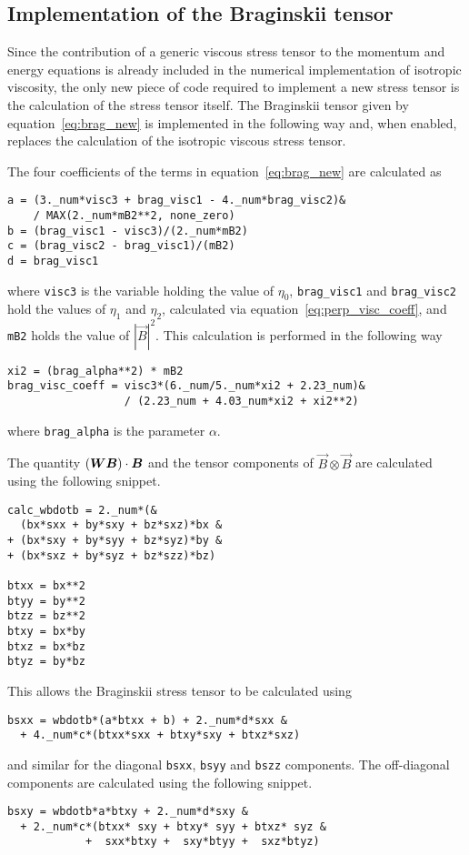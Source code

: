 \subsection{Implementation of the Braginskii tensor}

Since the contribution of a generic viscous stress tensor to the momentum and energy equations is already included in the numerical implementation of isotropic viscosity, the only new piece of code required to implement a new stress tensor is the calculation of the stress tensor itself. The Braginskii tensor given by equation~\eqref{eq:brag_new} is implemented in the following way and, when enabled, replaces the calculation of the isotropic viscous stress tensor. 

The four coefficients of the terms in equation~\eqref{eq:brag_new} are calculated as
\begin{verbatim}
a = (3._num*visc3 + brag_visc1 - 4._num*brag_visc2)&
    / MAX(2._num*mB2**2, none_zero)
b = (brag_visc1 - visc3)/(2._num*mB2)
c = (brag_visc2 - brag_visc1)/(mB2)
d = brag_visc1
\end{verbatim}
where \verb|visc3| is the variable holding the value of $\eta_0$, \verb|brag_visc1| and \verb|brag_visc2| hold the values of $\eta_1$ and $\eta_2$, calculated via equation~\eqref{eq:perp_visc_coeff}, and \verb|mB2| holds the value of $|\vec{B}|^2$. This calculation is performed in the following way
\begin{verbatim}
xi2 = (brag_alpha**2) * mB2
brag_visc_coeff = visc3*(6._num/5._num*xi2 + 2.23_num)&
                  / (2.23_num + 4.03_num*xi2 + xi2**2)
\end{verbatim}
where \verb|brag_alpha| is the parameter $\alpha$.

The quantity $({\bm W} {\bm B}) \cdot {\bm B}$ and the tensor components of $\vec{B} \otimes \vec{B}$ are calculated using the following snippet.
\begin{verbatim}
calc_wbdotb = 2._num*(&
  (bx*sxx + by*sxy + bz*sxz)*bx &
+ (bx*sxy + by*syy + bz*syz)*by &
+ (bx*sxz + by*syz + bz*szz)*bz)

btxx = bx**2
btyy = by**2
btzz = bz**2
btxy = bx*by
btxz = bx*bz
btyz = by*bz
\end{verbatim}

This allows the Braginskii stress tensor to be calculated using
\begin{verbatim}
bsxx = wbdotb*(a*btxx + b) + 2._num*d*sxx &
  + 4._num*c*(btxx*sxx + btxy*sxy + btxz*sxz)
\end{verbatim}
and similar for the diagonal \verb|bsxx|, \verb|bsyy| and \verb|bszz| components. The off-diagonal components are calculated using the following snippet.
\begin{verbatim}
bsxy = wbdotb*a*btxy + 2._num*d*sxy &
  + 2._num*c*(btxx* sxy + btxy* syy + btxz* syz &
            +  sxx*btxy +  sxy*btyy +  sxz*btyz)
\end{verbatim}

